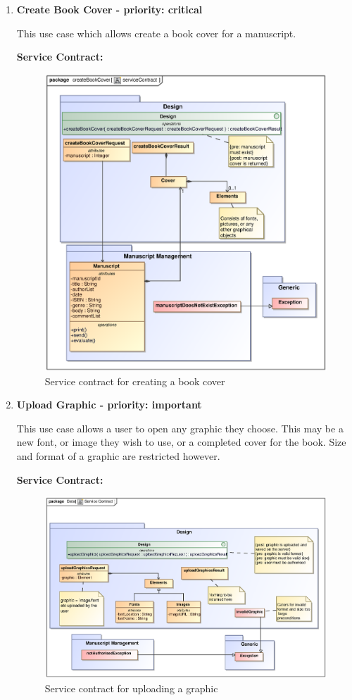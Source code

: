 \begin{enumerate}
\newpage
\item \textbf{Create Book Cover - priority: critical}
\par{This use case which allows create a book cover for a  manuscript.}
\par{\textbf{Service Contract:} 
}
 \begin{figure}[h]
\centering
\includegraphics[scale=0.8,width=400px]{epsImages/Design/createBookCover.eps}
\caption{Service contract for creating a book cover}
\end{figure}

\newpage
\item \textbf{Upload Graphic - priority: important}\\
\par{This use case allows a user to open any graphic they choose. This may be a new font, or image they wish to use, or a completed cover for the book. Size and format of a graphic are restricted however.}
\par{\textbf{Service Contract:}}
\begin{figure}[h]
\centering
\includegraphics[scale=0.8,width=400px]{epsImages/Design/uploadGraphicsServiceContract.eps}
\caption{Service contract for uploading a graphic}
\end{figure}
\end{enumerate}
